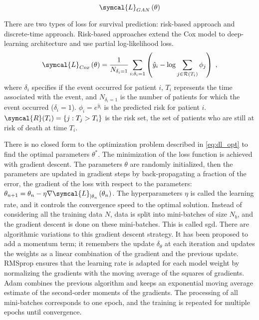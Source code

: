 \documentclass[../main.tex]{subfiles}
\begin{document}
	 \begin{equation}
		 \symcal{L}_{GAN}\left(\theta\right)
	 \end{equation}

	 There are two types of loss for survival prediction: risk-based approach and discrete-time approach.
	 Risk-based approaches extend the Cox model to deep-learning architecture and use partial log-likelihood loss.
	 \begin{equation}
		 \symcal{L}_{Cox}\left(\theta\right) = \frac{1}{N_{\delta_i = 1}} \sum_{i:\delta_i=1} \left(\hat{y}_i - \log \sum_{j \in \mathcal{R}(T_i)}\phi_j \right)\; \text{,} \label{eq:cox_loss}
	 \end{equation}
	 where \(\delta_i\) specifies if the event occurred for patient \(i\), \(T_i\) represents the time associated with the event, and \(N_{\delta_i = 1}\) is the number of patients for which the event occurred (\(\delta_i = 1\)).
	 \(\phi_i = e^{\hat{y}_i}\) is the predicted risk for patient \(i\).
	 \(\symcal{R}(T_i) = \{j: T_j > T_i\}\) is the risk set, the set of patients who are still at risk of death at time \(T_i\).

	 There is no closed form to the optimization problem described in \cref{eq:dl_opt} to find the optimal parameters \(\theta^{*}\).
	 The minimization of the loss function is achieved with gradient descent.
	 The parameters \(\theta\) are randomly initialized, then the parameters are updated in gradient steps by back-propagating a fraction of the error, \ie{}the gradient of the loss with respect to the parameters: \(\theta_{n+1} = \theta_{n} - \eta \nabla \symcal{L}_{|\theta_n}\left(\theta_{n}\right)\).
	 The hyperparameters \(\eta\) is called the learning rate, and it controls the convergence speed to the optimal solution.
	 Instead of considering all the training data \(N\), data is split into mini-batches of size \(N_b\), and the gradient descent is done on these mini-batches.
	 This is called \gls{sgd}.
	 There are algorithmic variations to this gradient descent strategy.
	 It has been proposed to add a momentum term; it remembers the update \(\delta_{\theta}\) at each iteration and updates the weights as a linear combination of the gradient and the previous update.
	 RMSprop ensures that the learning rate is adapted for each model weight by normalizing the gradients with the moving average of the squares of gradients.
	 Adam combines the previous algorithm and keeps an exponential moving average estimate of the second-order moments of the gradients.
	 The processing of all mini-batches corresponds to one epoch, and the training is repeated for multiple epochs until convergence.
\end{document}
